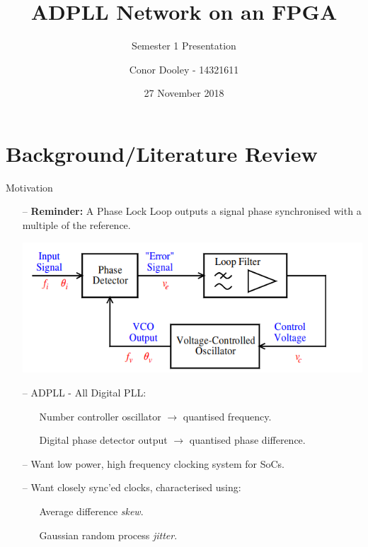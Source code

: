 \documentclass{beamer}
\title{ADPLL Network on an FPGA}
\author{Conor Dooley - 14321611}%
\subtitle{Semester 1 Presentation}
\date{27 November 2018}
\institute{Supervisors: B. Mulkeen \& Dr. E. Blokhina}
\begin{document}
\begin{frame}
    \titlepage
\end{frame}

\section*{Background/Literature Review}
\begin{frame}{Motivation}
	\begin{itemize}
        \item[--]
            \textbf{Reminder:} A Phase Lock Loop outputs a signal phase synchronised with a multiple of the reference.
            \begin{center}
            \includegraphics[scale=0.3]{mulkeen_pll}
            \begin{tiny}\begin{flushright}\cite{bm_slides}\end{flushright}\end{tiny}
            \end{center}
        \item[--]
            ADPLL - All Digital PLL:
            \begin{itemize}
	        \item[]
	            Number controller oscillator $\rightarrow$ quantised frequency.
	        \item[]
	            Digital phase detector output $\rightarrow$ quantised phase difference.
        	\end{itemize}
        \end{itemize}
    \begin{itemize}
        \item[--]
        	Want low power, high frequency clocking system for SoCs.
        \item[--]
            Want closely sync'ed clocks, characterised using:
    		\begin{itemize}
    			\item[]
    				Average difference \textit{skew}.
    			\item[]
	    			Gaussian random process \textit{jitter}.
    		\end{itemize}
    \end{itemize}
\end{frame}
\end{document}
